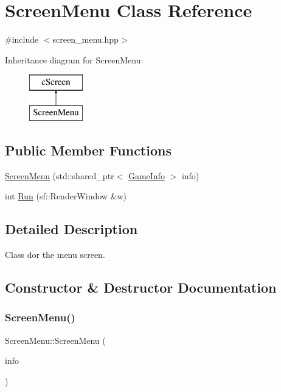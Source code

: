 \hypertarget{classScreenMenu}{}\section{Screen\+Menu Class Reference}
\label{classScreenMenu}


{\ttfamily \#include $<$screen\+\_\+menu.\+hpp$>$}

Inheritance diagram for Screen\+Menu\+:\begin{figure}[H]
\begin{center}
\leavevmode
\includegraphics[height=2.000000cm]{classScreenMenu}
\end{center}
\end{figure}
\subsection*{Public Member Functions}
\begin{DoxyCompactItemize}
\item 
\hyperlink{classScreenMenu_a099466763f518ca39893224825c45968}{Screen\+Menu} (std\+::shared\+\_\+ptr$<$ \hyperlink{classGameInfo}{Game\+Info} $>$ info)
\item 
int \hyperlink{classScreenMenu_a86af8a6c97bf315bbe88cd2d7ab35abf}{Run} (sf\+::\+Render\+Window \&w)
\end{DoxyCompactItemize}


\subsection{Detailed Description}
Class dor the menu screen. 

\subsection{Constructor \& Destructor Documentation}
\hypertarget{classScreenMenu_a099466763f518ca39893224825c45968}{}\label{classScreenMenu_a099466763f518ca39893224825c45968} 
\subsubsection{\texorpdfstring{Screen\+Menu()}{ScreenMenu()}}
{\footnotesize\ttfamily Screen\+Menu\+::\+Screen\+Menu (\begin{DoxyParamCaption}\item[{std\+::shared\+\_\+ptr$<$ \hyperlink{classGameInfo}{Game\+Info} $>$}]{info }\end{DoxyParamCaption})\hspace{0.3cm}{\ttfamily [inline]}}

